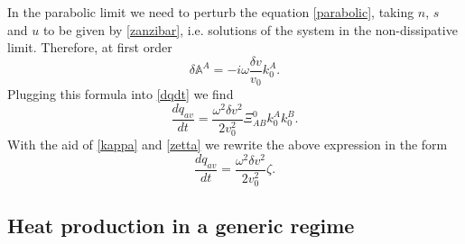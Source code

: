 \documentclass[useAMS,usenatbib,prd,twocolumn,nofootinbib]{revtex4-1}
\begin{document}
In the parabolic limit we need to perturb the equation \eqref{parabolic}, taking $n$, $s$ and $u$ to be given by \eqref{zanzibar}, i.e. solutions of the system in the non-dissipative limit. Therefore, at first order
\begin{equation}
\delta \mathbb{A}^A =-i \omega  \dfrac{\delta v}{v_0} k_0^A . 
\end{equation} 
Plugging this formula into \eqref{dqdt} we find
\begin{equation}
\dfrac{dq_{av}}{dt} = \dfrac{\omega^2 \delta v^2}{2v_0^2} \Xi_{AB}^0 k_0^A k_0^B .
\end{equation}
With the aid of \eqref{kappa} and \eqref{zetta} we rewrite the above expression in the form
\begin{equation}
\dfrac{dq_{av}}{dt} = \dfrac{\omega^2 \delta v^2}{2v_0^2} \zeta .
\end{equation}



\subsection{Heat production in a generic regime}\label{sezioneVC}
\end{document}
